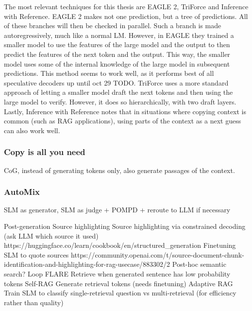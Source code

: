 The most relevant techniques for this thesis are EAGLE 2, TriForce and Inference with Reference. EAGLE 2 makes not one prediction, but a tree of predictions. All of these branches will then be checked in parallel. Such a branch is made autoregressively, much like a normal LM. However, in EAGLE they trained a smaller model to use the features of the large model and the output to then predict the features of the next token and the output. This way, the smaller model uses some of the internal knowledge of the large model in subsequent predictions. This method seems to work well, as it performs best of all speculative decoders up until oct 29 TODO. TriForce uses a more standard approach of letting a smaller model draft the next tokens and then using the large model to verify. However, it does so hierarchically, with two draft layers. Lastly, Inference with Reference notes that in situations where copying context is common (such as RAG applications), using parts of the context as a next guess can also work well.
\subsubsection{Copy is all you need}
CoG, instead of generating tokens only, also generate passages of the context.

\subsubsection{AutoMix}
SLM as generator, SLM as judge + POMPD + reroute to LLM if necessary

Post-generation
Source highlighting
	Source highlighting via constrained decoding (ask LLM which source it used)
	https://huggingface.co/learn/cookbook/en/structured\_generation
	Finetuning SLM to quote sources
https://community.openai.com/t/source-document-chunk-identification-and-highlighting-for-rag-usecase/883302/2
Post-hoc semantic search?
Loop
FLARE
	Retrieve when generated sentence has low probability tokens
Self-RAG
	Generate retrieval tokens (needs finetuning)
Adaptive RAG
Train SLM to classify single-retrieval question vs multi-retrieval (for efficiency rather than quality)